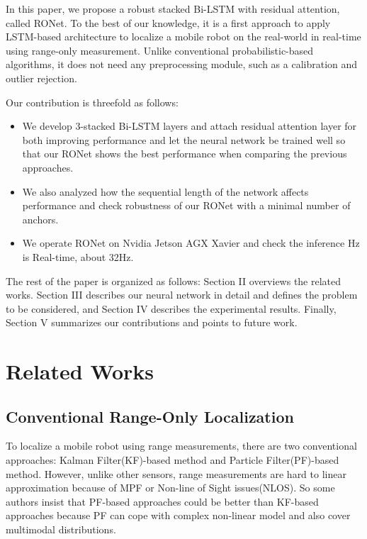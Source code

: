 \documentclass[letterpaper, 10 pt, conference]{ieeeconf}  %
\begin{document}
In this paper, we propose a robust stacked Bi-LSTM with residual attention, called RONet. To the best of our knowledge, it is a first approach to apply LSTM-based architecture to localize a mobile robot on the real-world in real-time using range-only measurement. Unlike conventional probabilistic-based algorithms, it does not need any preprocessing module, such as a calibration and outlier rejection.

Our contribution is threefold as follows:
\begin{itemize}
	\item We develop 3-stacked Bi-LSTM layers and attach residual attention layer for both improving performance and let the neural network be trained well so that our RONet shows the best performance when comparing the previous approaches.
	\item We also analyzed how the sequential length of the network affects performance and check robustness of our RONet with a minimal number of anchors.
	\item We operate RONet on Nvidia Jetson AGX Xavier and check the inference Hz is Real-time, about 32Hz. 
	
\end{itemize}

The rest of the paper is organized as follows: Section II overviews the related works. Section III describes our neural network in detail and defines the problem to be considered, and Section IV describes the experimental results. Finally, Section V summarizes our contributions and points to future work.

\section{Related Works}
\subsection{Conventional Range-Only Localization}

To localize a mobile robot using range measurements, there are two conventional approaches: Kalman Filter(KF)-based method and Particle Filter(PF)-based method. However, unlike other sensors, range measurements are hard to linear approximation because of MPF or Non-line of Sight issues(NLOS). So some authors insist that PF-based approaches could be better than KF-based approaches because PF can cope with complex non-linear model and also cover multimodal distributions\cite{gonzalez2009mobile, blanco2008pure,shetty2018particle}. 
\end{document}
